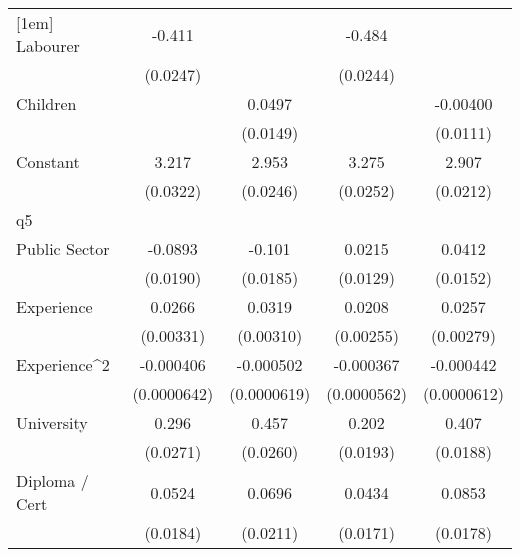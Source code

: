 {\begin{tabular}{l*{4}{c}}
[1em]
Labourer            &      -0.411\sym{***}&                     &      -0.484\sym{***}&                     \\
                    &    (0.0247)         &                     &    (0.0244)         &                     \\
[1em]
Children            &                     &      0.0497\sym{***}&                     &    -0.00400         \\
                    &                     &    (0.0149)         &                     &    (0.0111)         \\
[1em]
Constant            &       3.217\sym{***}&       2.953\sym{***}&       3.275\sym{***}&       2.907\sym{***}\\
                    &    (0.0322)         &    (0.0246)         &    (0.0252)         &    (0.0212)         \\
\hline
q5                  &                     &                     &                     &                     \\
Public Sector       &     -0.0893\sym{***}&      -0.101\sym{***}&      0.0215         &      0.0412\sym{**} \\
                    &    (0.0190)         &    (0.0185)         &    (0.0129)         &    (0.0152)         \\
[1em]
Experience          &      0.0266\sym{***}&      0.0319\sym{***}&      0.0208\sym{***}&      0.0257\sym{***}\\
                    &   (0.00331)         &   (0.00310)         &   (0.00255)         &   (0.00279)         \\
[1em]
Experience^{2}      &   -0.000406\sym{***}&   -0.000502\sym{***}&   -0.000367\sym{***}&   -0.000442\sym{***}\\
                    & (0.0000642)         & (0.0000619)         & (0.0000562)         & (0.0000612)         \\
[1em]
University          &       0.296\sym{***}&       0.457\sym{***}&       0.202\sym{***}&       0.407\sym{***}\\
                    &    (0.0271)         &    (0.0260)         &    (0.0193)         &    (0.0188)         \\
[1em]
Diploma / Cert      &      0.0524\sym{**} &      0.0696\sym{***}&      0.0434\sym{*}  &      0.0853\sym{***}\\
                    &    (0.0184)         &    (0.0211)         &    (0.0171)         &    (0.0178)         \\

\end{tabular}}
